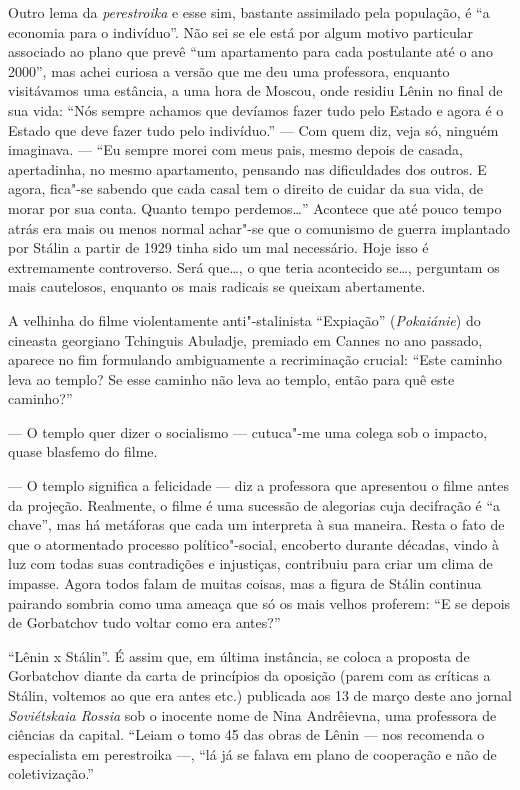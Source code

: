 Outro lema da \emph{perestroika} e esse sim, bastante assimilado pela
população, é ``a economia para o indivíduo''. Não sei se ele está por
algum motivo particular associado ao plano que prevê ``um apartamento
para cada postulante até o ano 2000'', mas achei curiosa a versão que me
deu uma professora, enquanto visitávamos uma estância, a uma hora de
Moscou, onde residiu Lênin no final de sua vida: ``Nós sempre achamos
que devíamos fazer tudo pelo Estado e agora é o Estado que deve fazer
tudo pelo indivíduo.'' --- Com quem diz, veja só, ninguém imaginava. ---
``Eu sempre morei com meus pais, mesmo depois de casada, apertadinha, no
mesmo apartamento, pensando nas dificuldades dos outros. E agora,
fica"-se sabendo que cada casal tem o direito de cuidar da sua vida, de
morar por sua conta. Quanto tempo perdemos\ldots{}'' Acontece que até pouco
tempo atrás era mais ou menos normal achar"-se que o comunismo de guerra
implantado por Stálin a partir de 1929 tinha sido um mal necessário.
Hoje isso é extremamente controverso. Será que\ldots{}, o que teria
acontecido se\ldots{}, perguntam os mais cautelosos, enquanto os mais
radicais se queixam abertamente.

A velhinha do filme violentamente anti"-stalinista ``Expiação''
(\emph{Pokaiánie}) do cineasta georgiano Tchinguis Abuladje, premiado em
Cannes no ano passado, aparece no fim formulando ambiguamente a
recriminação crucial: ``Este caminho leva ao templo? Se esse caminho não
leva ao templo, então para quê este caminho?''

--- O templo quer dizer o socialismo --- cutuca"-me uma colega sob o
impacto, quase blasfemo do filme.

--- O templo significa a felicidade --- diz a professora que apresentou o
filme antes da projeção. Realmente, o filme é uma sucessão de alegorias
cuja decifração é ``a chave'', mas há metáforas que cada um interpreta à
sua maneira. Resta o fato de que o atormentado processo político"-social,
encoberto durante décadas, vindo à luz com todas suas contradições e
injustiças, contribuiu para criar um clima de impasse. Agora todos falam
de muitas coisas, mas a figura de Stálin continua pairando sombria como
uma ameaça que só os mais velhos proferem: ``E se depois de Gorbatchov
tudo voltar como era antes?''

``Lênin x Stálin''. É assim que, em última instância, se coloca a
proposta de Gorbatchov diante da carta de princípios da oposição (parem
com as críticas a Stálin, voltemos ao que era antes etc.) publicada aos
13 de março deste ano jornal \emph{Soviétskaia Rossia} sob o inocente
nome de Nina Andrêievna, uma professora de ciências da capital. ``Leiam
o tomo 45 das obras de Lênin --- nos recomenda o especialista em
perestroika ---, ``lá já se falava em plano de cooperação e não de
coletivização.''

